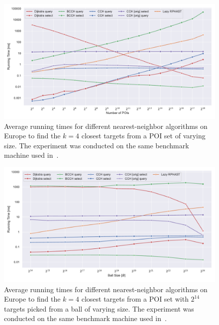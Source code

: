 \documentclass[a4paper, english, cleveref]{lipics-v2021}
\begin{document}
\begin{figure}
\centering
\includegraphics[width=\linewidth]{fig/repr_knn_num_pois.pdf}
\caption{
Average running times for different nearest-neighbor algorithms on Europe to find the $k=4$ closest targets from a POI set of varying size.
The experiment was conducted on the same benchmark machine used in~\cite{TODO}. %
}\label{fig:knn_num_pois}
\end{figure}

\begin{figure}
\centering
\includegraphics[width=\linewidth]{fig/repr_knn_ball_size.pdf}
\caption{
Average running times for different nearest-neighbor algorithms on Europe to find the $k=4$ closest targets from a POI set with $2^{14}$ targets picked from a ball of varying size.
The experiment was conducted on the same benchmark machine used in~\cite{TODO}. %
}\label{fig:knn_ball_size}
\end{figure}
\end{document}
